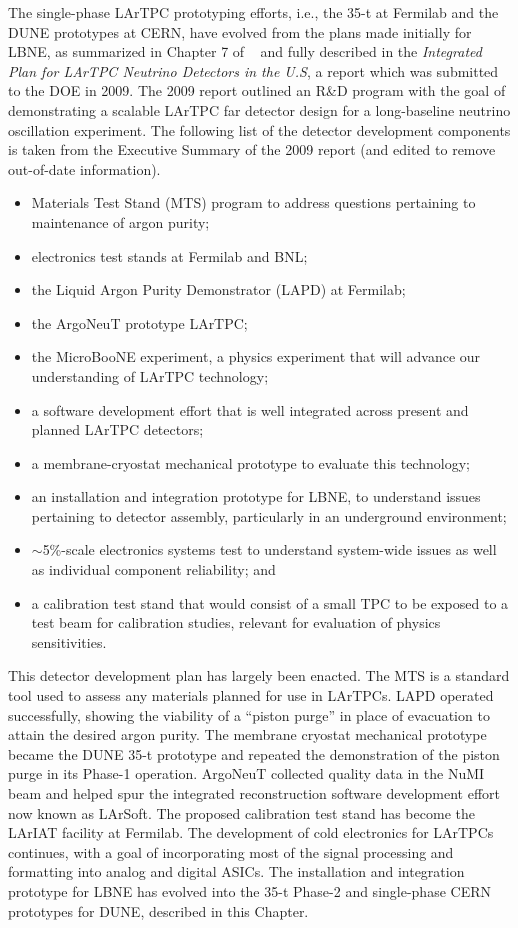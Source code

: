 The single-phase LArTPC prototyping efforts, i.e., the 35-t at
Fermilab and the DUNE prototypes at CERN, have evolved from the plans
made initially for LBNE, as summarized in Chapter 7 of \anxlbnefd~\cite{cdr-annex-lbne-design} 
and fully described in the \textit{Integrated Plan for LArTPC Neutrino
  Detectors in the U.S}, a report which was submitted to the DOE in
2009.  The 2009 report outlined an R\&D program with the goal of
demonstrating a scalable LArTPC far detector design for a
long-baseline neutrino oscillation experiment.  The following list of
the detector development components is taken from the Executive
Summary of the 2009 report (and edited to remove out-of-date
information).
\begin{itemize}
   \item Materials Test Stand (MTS) program
   to address questions pertaining to maintenance of argon purity;
    \item electronics test stands at Fermilab and BNL;
    \item the Liquid Argon Purity Demonstrator (LAPD) at Fermilab;
    \item the ArgoNeuT prototype LArTPC;
    \item the MicroBooNE experiment, a physics experiment that will
      advance our understanding of LArTPC technology;
    \item a software development effort that is well integrated across
      present and planned LArTPC detectors;
    \item a membrane-cryostat mechanical prototype to evaluate this technology;
    \item an installation and integration prototype for LBNE, to
      understand issues pertaining to detector assembly, particularly
      in an underground environment;
    \item $\sim$5\%-scale electronics systems test to understand
      system-wide issues as well as individual component reliability; and
    \item a calibration test stand that would consist of a small TPC
      to be exposed to a test beam for calibration studies, relevant
      for evaluation of physics sensitivities.
\end{itemize}

This detector development plan has largely been enacted.  The MTS is a
standard tool used to assess any materials planned for use in LArTPCs.
LAPD operated successfully, showing the viability of a ``piston purge'' in
place of evacuation to attain the desired argon purity.  The membrane
cryostat mechanical prototype became the DUNE 35-t prototype and
repeated the demonstration of the piston purge in its Phase-1
operation.  ArgoNeuT collected quality data in the NuMI beam and
helped spur the integrated reconstruction software development effort
now known as LArSoft.  The proposed calibration test stand has become
the LArIAT facility at Fermilab.  The development of cold electronics
for LArTPCs continues, with a goal of incorporating most of the signal
processing and formatting into analog and digital ASICs.  The
installation and integration prototype for LBNE has evolved into the
35-t Phase-2 and single-phase CERN prototypes for DUNE, described
in this Chapter.
 
